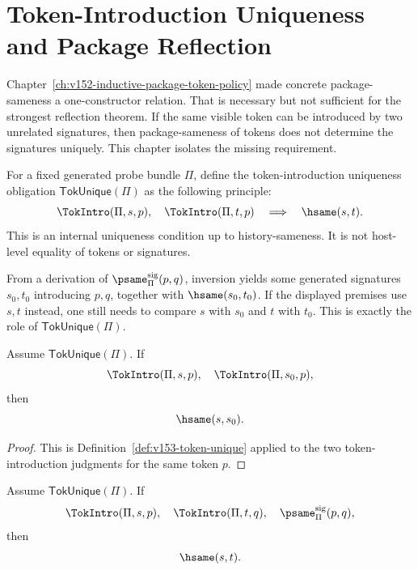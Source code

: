 \chapter{Token-Introduction Uniqueness and Package Reflection}
\label{ch:v153-token-intro-uniqueness}

Chapter~\ref{ch:v152-inductive-package-token-policy} made concrete package-sameness a one-constructor relation. That is necessary but not sufficient for the strongest reflection theorem. If the same visible token can be introduced by two unrelated signatures, then package-sameness of tokens does not determine the signatures uniquely. This chapter isolates the missing requirement.

\begin{definition}
\label{def:v153-token-unique}
For a fixed generated probe bundle \(\Pi\), define the token-introduction uniqueness obligation \(\mathsf{TokUnique}(\Pi)\) as the following principle:
\[
  \TokIntro(\Pi,s,p),\quad
  \TokIntro(\Pi,t,p)
  \quad\Longrightarrow\quad
  \hsame(s,t).
\]
This is an internal uniqueness condition up to history-sameness. It is not host-level equality of tokens or signatures.
\end{definition}

\begin{remark}
From a derivation of \(\psame_{\Pi}^{\mathrm{sig}}(p,q)\), inversion yields some generated signatures \(s_0,t_0\) introducing \(p,q\), together with \(\hsame(s_0,t_0)\). If the displayed premises use \(s,t\) instead, one still needs to compare \(s\) with \(s_0\) and \(t\) with \(t_0\). This is exactly the role of \(\mathsf{TokUnique}(\Pi)\).
\end{remark}

\begin{lemma}
\label{lem:v153-token-replacement}
Assume \(\mathsf{TokUnique}(\Pi)\). If
\[
  \TokIntro(\Pi,s,p),\quad
  \TokIntro(\Pi,s_0,p),
\]
then
\[
  \hsame(s,s_0).
\]
\end{lemma}

\begin{proof}
This is Definition~\ref{def:v153-token-unique} applied to the two token-introduction judgments for the same token \(p\).
\end{proof}

\begin{theorem}
\label{thm:v153-package-reflection-token-unique}
Assume \(\mathsf{TokUnique}(\Pi)\). If
\[
  \TokIntro(\Pi,s,p),\quad
  \TokIntro(\Pi,t,q),\quad
  \psame_{\Pi}^{\mathrm{sig}}(p,q),
\]
then
\[
  \hsame(s,t).
\]
\end{theorem}

